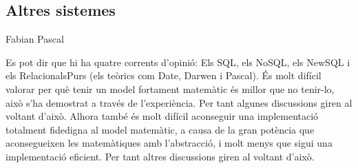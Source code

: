 









\subsection{Altres sistemes}

\todo{}



Fabian Pascal %



Es pot dir que hi ha quatre corrents d'opinió: Els SQL, els NoSQL, els NewSQL i els RelacionalsPurs (els teòrics com Date, Darwen i Pascal).
És molt difícil valorar per què tenir un model fortament matemàtic és millor que no tenir-lo, això s'ha demostrat a través de l'experiència. Per tant algunes discussions giren al voltant d'això. Alhora també és molt difícil aconseguir una implementació totalment fidedigna al model matemàtic, a causa de la gran potència que aconsegueixen les matemàtiques amb l'abstracció, i molt menys que sigui una implementació eficient. Per tant altres discussions giren al voltant d'això. 

